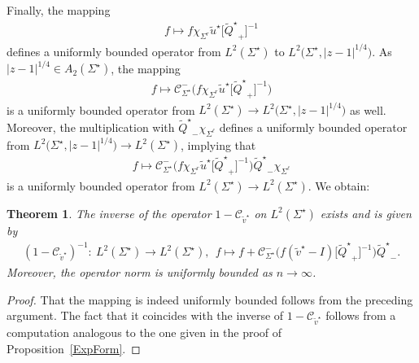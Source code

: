 \documentclass[11pt]{article}
\numberwithin{equation}{section}
\newcommand{\Id}{I}
\newcommand{\stQ}{{\widetilde Q^\star}}
\newcommand{\stv}{{\widetilde v^\star}}
\newcommand{\stu}{{\widetilde u^\star}}
\newcommand{\sCau}{\mathcal C_{\Sigma^\star}}
\newcommand{\sCautv}{\mathcal C_{\stv}}
\newcommand{\Sigl}{\Sigma^\ell}
\newcommand{\Sigr}{\Sigma^r}
\newtheorem{Theorem}{Theorem}[section]
\numberwithin{equation}{section}
\begin{document}
Finally, the mapping
\begin{align*}
 f \mapsto f\chi_{\Sigr} \stu \big[\stQ_+\big]^{-1}
\end{align*}
defines a uniformly bounded operator from $L^2(\Sigma^\star)$ to $L^2\big(\Sigma^\star, |z-1|^{1/4}\big)$. As $|z-1|^{1/4} \in A_2(\Sigma^\star)$, the mapping
\begin{align*}
 f \mapsto \sCau^-\big(f\chi_{\Sigr} \stu \big[\stQ_+\big]^{-1}\big)
\end{align*}
is a uniformly bounded operator from $L^2(\Sigma^\star) \to L^2\big(\Sigma^\star, |z-1|^{1/4} \big)$ as well. Moreover, the multiplication with $\stQ_-\chi_{\Sigl}$ defines a uniformly bounded operator from $L^2\big(\Sigma^\star, |z-1|^{1/4}\big) \to L^2(\Sigma^\star)$, implying that
\begin{align*}
 f \mapsto \sCau^-\big(f\chi_{\Sigr} \stu \big[\stQ_+\big]^{-1}\big)\stQ_-\chi_{\Sigma^\ell}
\end{align*}
is a uniformly bounded operator from $L^2(\Sigma^\star)\to L^2(\Sigma^\star)$. We obtain:
\begin{Theorem}\label{UniformBoundedness}
The inverse of the operator $1-\sCautv$ on $L^2(\Sigma^\star)$ exists and is given by
\begin{align*}
 (1-\sCautv)^{-1} \colon\ L^2(\Sigma^\star) \to L^2(\Sigma^\star), \ \ f \mapsto f + \sCau^-\big(f (\stv-\Id)\big[\stQ_+\big]^{-1}\big)\stQ_-.
\end{align*}
Moreover, the operator norm is uniformly bounded as $n \to \infty$.
\end{Theorem}
\begin{proof}
That the mapping is indeed uniformly bounded follows from the preceding argument. The fact that it coincides with the inverse of $1-\sCautv$ follows from a computation analogous to the one given in the proof of Proposition~\ref{ExpForm}.
\end{proof}
\end{document}
